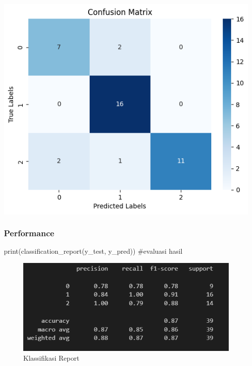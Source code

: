 \documentclass[
  letterpaper,
  DIV=11,
  numbers=noendperiod]{scrreprt}
\newenvironment{Shaded}{\begin{snugshade}}{\end{snugshade}}
\newcommand{\BuiltInTok}[1]{\textcolor[rgb]{0.00,0.23,0.31}{#1}}
\newcommand{\CommentTok}[1]{\textcolor[rgb]{0.37,0.37,0.37}{#1}}
\newcommand{\NormalTok}[1]{\textcolor[rgb]{0.00,0.23,0.31}{#1}}
\begin{document}
\includegraphics{Asset/confusion_knn.png}

\hypertarget{performance}{%
\subsubsection*{Performance}\label{performance}}

\begin{Shaded}
\begin{Highlighting}[]
\BuiltInTok{print}\NormalTok{(classification\_report(y\_test, y\_pred)) }\CommentTok{\#evaluasi hasil  }
\end{Highlighting}
\end{Shaded}

\begin{figure}

{\centering \includegraphics{Asset/classreport_knn.png}

}

\caption{Klassifikasi Report}

\end{figure}
\end{document}
